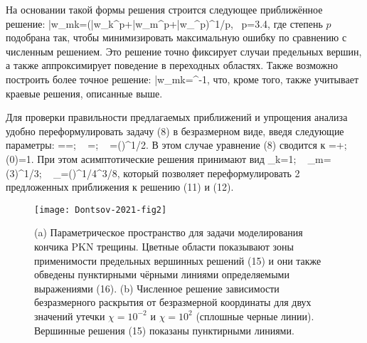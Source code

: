 \documentclass[main.tex]{subfiles}
\begin{document}
На основании такой формы решения строится следующее приближённое решение:
\beq
\bar{w}_{mk}=\left(\bar{w}_k^p+\bar{w}_m^p+\bar{w}_{}^p\right)^{1/p},\,\,\,\,\,p=3.4,
\eeq
где степень $p$ подобрана так, чтобы минимизировать максимальную ошибку по сравнению с численным решением.
Это решение точно фиксирует случаи предельных вершин, а также аппроксимирует поведение в переходных областях.
Также возможно построить более точное решение:
\beq
\bar{w}_{mk}=^{-1},
\eeq
что, кроме того, также учитывает краевые решения, описанные выше.

Для проверки правильности предлагаемых приближений и упрощения анализа удобно переформулировать задачу (8) в безразмерном виде, введя следующие параметры:
\beq
\Omega==;\,\,\,\,\,
\hat{\xi}=;\,\,\,\,\,
\chi=\left(\right)^{1/2}.
\eeq
В этом случае уравнение (8) сводится к
\beq
{}=+;\,\,\,\,\,\Omega(0)=1.
\eeq
При этом асимптотические решения принимают вид
\beq
\Omega_k=1;\,\,\,\,\,
\Omega_m=\left(3\hat{\xi}\right)^{1/3};\,\,\,\,\,
\Omega_{}=\left(\right)^{1/4}\hat{\xi}^{3/8},
\eeq
который позволяет переформулировать 2 предложенных приближения к решению (11) и (12).

\begin{figure}[H]
\center
\texttt{[image: Dontsov-2021-fig2]}
\vspace*{-10mm}
\caption{(a) Параметрическое пространство для задачи моделирования кончика PKN трещины. Цветные области показывают зоны применимости предельных вершинных решений (15) и они также обведены пунктирными чёрными линиями определяемыми выражениями (16). (b) Численное решение зависимости безразмерного раскрытия от безразмерной координаты для двух значений утечки $\chi=10^{-2}$ и $\chi=10^2$ (сплошные черные линии). Вершинные решения (15) показаны пунктирными линиями.}
\label{fig:Dontsov-2021-fig2}
\end{figure}
\end{document}
